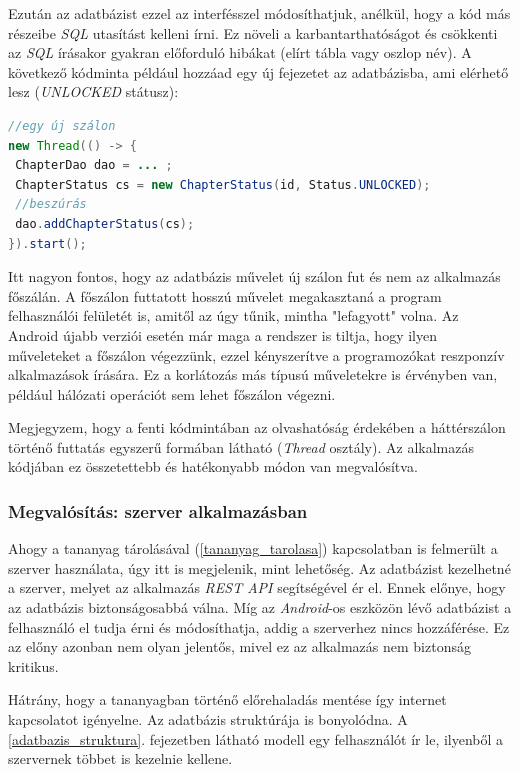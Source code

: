 \documentclass[12pt,a4paper]{article}
\begin{document}
	Ezután az adatbázist ezzel az interfésszel módosíthatjuk, anélkül, hogy a kód más részeibe \textit{SQL} utasítást kelleni írni. Ez növeli a karbantarthatóságot és 
	csökkenti az \textit{SQL} írásakor gyakran előforduló hibákat (elírt tábla vagy oszlop név). A következő kódminta például hozzáad egy új fejezetet az adatbázisba, ami elérhető lesz (\textit{UNLOCKED} státusz):
	
	\begin{lstlisting}[language=Java]
//egy új szálon
new Thread(() -> {
 ChapterDao dao = ... ;
 ChapterStatus cs = new ChapterStatus(id, Status.UNLOCKED);
 //beszúrás
 dao.addChapterStatus(cs);
}).start();
	\end{lstlisting}
	
	Itt nagyon fontos, hogy az adatbázis művelet új szálon fut és nem az alkalmazás főszálán. A főszálon futtatott hosszú művelet megakasztaná a program felhasználói felületét is, amitől az úgy tűnik, mintha "lefagyott" volna. Az Android újabb verziói esetén már maga a rendszer is tiltja, hogy ilyen műveleteket 
	a főszálon végezzünk, ezzel kényszerítve a programozókat reszponzív alkalmazások írására. Ez a korlátozás más típusú műveletekre is érvényben van, például hálózati operációt sem lehet főszálon végezni.
	
	Megjegyzem, hogy a fenti kódmintában az olvashatóság érdekében a háttérszálon történő futtatás egyszerű formában látható (\textit{Thread} osztály). Az alkalmazás kódjában ez összetettebb és hatékonyabb módon van megvalósítva. 
	
	\subsubsection{Megvalósítás: szerver alkalmazásban}
	
	Ahogy a tananyag tárolásával (\ref{tananyag_tarolasa}) kapcsolatban is felmerült a szerver használata, úgy itt is megjelenik, mint lehetőség. Az adatbázist kezelhetné a szerver, melyet az alkalmazás \textit{REST API} segítségével ér el. Ennek előnye, hogy az adatbázis biztonságosabbá válna. Míg az \textit{Android}-os eszközön lévő adatbázist a felhasználó el tudja érni és módosíthatja, addig a szerverhez nincs hozzáférése. Ez az előny azonban nem olyan jelentős, mivel ez az alkalmazás nem biztonság kritikus. 
	
	Hátrány, hogy a tananyagban történő előrehaladás mentése így internet kapcsolatot igényelne. Az adatbázis struktúrája is bonyolódna. A \ref{adatbazis_struktura}. fejezetben látható modell egy felhasználót ír le, ilyenből a szervernek többet is kezelnie kellene.
	
\end{document}
